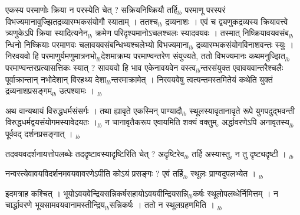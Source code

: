 \documentclass[article,12pt,a4paper]{memoir}%
\newcounter{parCount}
\begin{document}
	  
	  \pstart \leavevmode%
	एकस्य परमाणोः क्रिया न परस्येति चेत् ? सक्रियनिष्क्रियौ तर्हि{\tiny $_{lb}$} परमाणू परस्परं विभज्यमानावुज्झितद्रव्यारम्भकसंयोगौ स्याताम् । ततश्च{\tiny $_{lb}$} द्रव्यनाशः । एवं च द्व्यणुकद्रव्यस्य क्रियावत्त्वे त्र्यणुकेऽपि क्रिया स्यादित्यनेन{\tiny $_{lb}$} क्रमेण परिदृश्यमानोऽचलश्चलः स्यादवयवः । तस्मात् निष्क्रियावयवसंब{\tiny $_{lb}$}न्धिनो निष्क्रियाः परमाणवः चलावयवसंबन्धिभ्यश्चलेभ्यो विभज्यमाना{\tiny $_{lb}$} द्रव्यारम्भकसंयोगविनाशवन्तः स्युः । निरवयवो हि परमाणुर्यमणुमात्रनभो{\tiny $_{lb}$}देशमाक्रम्य परमाण्वन्तरेण संयुज्यते, ततो विभज्यमानः कथमनुज्झित{\tiny $_{lb}$}परमाण्वन्तरप्रत्यासत्तिकः स्यात् ? सावयवो हि भाव एकेनावयवेन वस्त्व{\tiny $_{lb}$}न्तरसंयुक्त एवावयवान्तरैश्चलैः पूर्वाक्रान्तान् नभोदेशान् विरहथ्य देशा{\tiny $_{lb}$}न्तरमाक्रामेत् । निरवयवेषु त्वत्यन्तमस्तमितेयं कथेति युक्तं द्रव्यनाशप्रसङ्गम्{\tiny $_{lb}$} उत्पश्यामः ।
	{}
	\pend%
      {\tiny $_{lb}$}

	  
	  \pstart \leavevmode%
	अथ वान्यथायं विरुद्धधर्मसंसर्गः । तथा ह्यावृते एकस्मिन् पाण्यादौ{\tiny $_{lb}$} स्थूलस्यावृतानावृते रूपे युगपदुद्भवन्ती विरुद्धधर्मद्वयसंयोगमस्यावेदयतः ।{\tiny $_{lb}$} न चानावृतैकरूप एवायमिति शक्यं वक्तुम्, अर्द्धावरणेऽपि अनावृतस्य{\tiny $_{lb}$} पूर्ववद् दर्शनप्रसङ्गात् ।
	{}
	\pend%
      {\tiny $_{lb}$}

	  
	  \pstart \leavevmode%
	तदवयवदर्शनायत्तोपलब्धेः तददृष्टावस्यादृष्टिरिति चेत् ? अदृष्टिरेव{\tiny $_{lb}$} तर्हि अस्यास्तु, न तु दृष्ट्यदृष्टी ।
	{}
	\pend%
      {\tiny $_{lb}$}

	  
	  \pstart \leavevmode%
	नन्वस्त्येवावयविदर्शनमवयवावरणेऽपीति कोऽयं प्रसङ्गः ? एवं तर्हि{\tiny $_{lb}$} स्थूलः प्राग्वदुपलभ्येत ।
	{}
	\pend%
      {\tiny $_{lb}$}

	  
	  \pstart \leavevmode%
	इदमत्राह कश्चित् । भूयोऽवयवेन्द्रियसन्निकर्षसहायोऽवयवीन्द्रियसन्नि{\tiny $_{lb}$}कर्षः स्थूलोपलब्धेर्निमित्तम् । न चार्द्धावरणे भूयसामवयवानामस्तीन्द्रिय{\tiny $_{lb}$}सन्निकर्षः । ततो न स्थूलग्रहणमिति ।
	{}
	\pend%
      {\tiny $_{lb}$}
\end{document}
